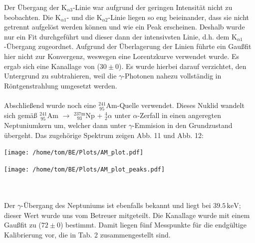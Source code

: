 \documentclass[german,  %
parskip=full,  %
]{scrartcl}
\begin{document}
Der Übergang der \(\mathrm{K}_{\alpha 3}\)-Linie war aufgrund der geringen Intensität nicht zu beobachten. Die \(\mathrm{K}_{\alpha 1}\)- und die \(\mathrm{K}_{\alpha 2}\)-Linie liegen so eng beieinander, dass sie nicht getrennt aufgelöst werden können und wie ein Peak erscheinen. Deshalb wurde nur ein Fit durchgeführt und dieser dann der intensivsten Linie, d.h. dem \(\mathrm{K}_{\alpha 1}\)-Übergang zugeordnet. Aufgrund der Überlagerung der Linien führte ein Gaußfit hier nicht zur Konvergenz, weswegen eine Lorentzkurve verwendet wurde. Es ergab sich eine Kanallage von (\(30\pm 0\)). Es wurde hierbei darauf verzichtet, den Untergrund zu subtrahieren, weil die \(\gamma\)-Photonen nahezu vollständig in Röntgenstrahlung umgesetzt werden. \\\\
Abschließend wurde noch eine \(^{241}_{\ 95}\)Am-Quelle verwendet. Dieses Nuklid wandelt sich gemäß \(^{241}_{\ 95}\)Am \(\rightarrow\) \(^{237\mathrm{m}}_{\ \ \ 93}\)Np + \(^4_2\alpha\) unter \(\alpha\)-Zerfall in einen angeregten Neptuniumkern um, welcher dann unter \(\gamma\)-Emmision in den Grundzustand übergeht. Das zugehörige Spektrum zeigen Abb. 11 und Abb. 12:  \\
\begin{minipage}{0.5\textwidth}\centering
\texttt{[image: /home/tom/BE/Plots/AM\_plot.pdf]}
\end{minipage}
\begin{minipage}{0.5\textwidth}\centering
\texttt{[image: /home/tom/BE/Plots/AM\_plot\_peaks.pdf]}
\end{minipage} \\\\
Der \(\gamma\)-Übergang des Neptuniums ist ebenfalls bekannt und liegt bei \(39.5\,\mathrm{keV}\); dieser Wert wurde uns vom Betreuer mitgeteilt. Die Kanallage wurde mit einem Gaußfit zu (\(72\pm 0\)) bestimmt. Damit liegen fünf Messpunkte für die endgültige Kalibrierung vor, die in Tab. 2 zusammengestellt sind. \\
\end{document}
